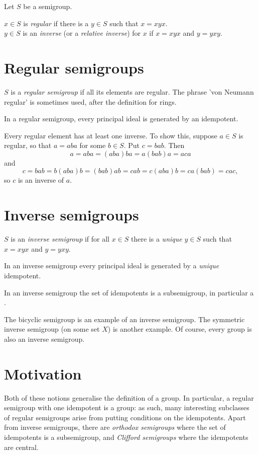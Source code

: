 \documentclass[12pt]{article}
\begin{document}

Let $S$ be a semigroup.

$x\in S$ is \emph{regular} if there is a $y\in S$ such that $x=xyx$.\\
$y\in S$ is an \emph{inverse}
(or a \emph{relative inverse})  %
for $x$ if $x=xyx$ and $y=yxy$.

\section{Regular semigroups}
$S$ is a \emph{regular semigroup} if all its elements are regular.
The phrase 'von Neumann regular' is sometimes used, after the definition for rings.

In a regular semigroup, every principal ideal is generated by an idempotent.

Every regular element has at least one inverse.
To show this, suppose $a\in S$ is regular,
so that $a = aba$ for some $b\in S$.
Put $c=bab$.
Then
\[
  a=aba=(aba)ba=a(bab)a=aca
\]
and
\[
  c=bab=b(aba)b=(bab)ab=cab=c(aba)b=ca(bab)=cac,
\]
so $c$ is an inverse of $a$.

\section{Inverse semigroups}
$S$ is an \emph{inverse semigroup} if for all $x\in S$ there is a \emph{unique} $y\in S$ such that $x=xyx$ and $y=yxy$.

In an inverse semigroup every principal ideal is generated by a \emph{unique} idempotent.

In an inverse semigroup the set of idempotents is a subsemigroup, in particular a .

The bicyclic semigroup is an example of an inverse semigroup.
The symmetric inverse semigroup (on some set $X$) is another example.
Of course, every group is also an inverse semigroup.

\section{Motivation}
Both of these notions generalise the definition of a group.  In particular, a regular semigroup with one idempotent is a group: as such, many interesting subclasses of regular semigroups arise from putting conditions on the idempotents.  Apart from inverse semigroups, there are \emph{orthodox semigroups} where the set of idempotents is a subsemigroup, and \emph{Clifford semigroups} where the idempotents are central.
\end{document}
